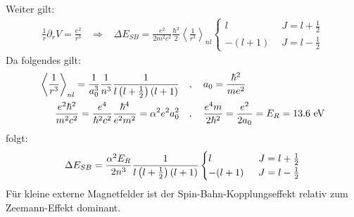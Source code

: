Weiter gilt:
\begin{align*}
    \frac{1}{r} \partial_r V = \frac{e^2}{r^3}
    \hspace{10pt} \Rightarrow \hspace{10pt}
    \Delta E_{SB} = \frac{e^2}{2 m^2 c^2} \frac{\hbar^2}{2}
        \left\langle \frac{1}{r^3} \right\rangle_{nl}
    \begin{cases}
        l \hspace{5pt} &J=l+\frac{1}{2}
        \\
        -(l+1) \hspace{5pt} &J=l-\frac{1}{2}
    \end{cases}
\end{align*}
Da folgendes gilt:
\begin{align*}
    \left\langle \frac{1}{r^3} \right\rangle_{nl}
    = \frac{1}{a_0^3} \frac{1}{n^3} \frac{1}{l \klammer{l+\frac{1}{2}} \klammer{l+1}}
    \hspace{10pt} &, \hspace{10pt}
    a_0 = \frac{\hbar^2}{m e^2}
    \\
    \frac{e^2 \hbar^2}{m^2 c^2} = \frac{e^4}{\hbar^2 c^2} \frac{\hbar^4}{e^2 m^2}
    = \alpha^2 e^2 a_0^2
    \hspace{10pt} &, \hspace{10pt}
    \frac{e^4 m}{2 \hbar^2} = \frac{e^2}{2 a_0} = E_R = 13.6 \ \mathrm{eV}
\end{align*}
folgt:
\begin{align*}
    \Delta E_{SB} = \frac{\alpha^2 E_R}{2 n^3} \frac{1}{l \left( l+\frac{1}{2} \right) \left( l+1 \right)}
    \begin{cases}
        l \hspace{5pt} &J = l+\frac{1}{2}
        \\
        -(l+1) \hspace{5pt} & J=l-\frac{1}{2}
    \end{cases}
\end{align*}
Für kleine externe Magnetfelder ist der Spin-Bahn-Kopplungseffekt relativ
zum Zeemann-Effekt dominant.
